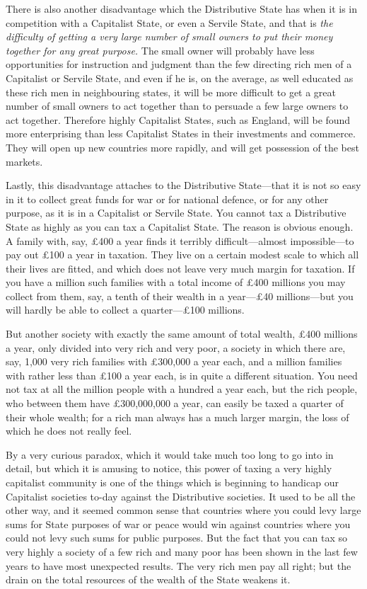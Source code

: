 \documentclass{book}
\begin{document}
There is also another disadvantage which the Distributive State has when it is in competition with a Capitalist State, or even a Servile State, and that is \emph{the difficulty of getting a very large number of small owners to put their money together for any great purpose.} The small owner will probably have less opportunities for instruction and judgment than the few directing rich men of a Capitalist or Servile State, and even if he is, on the average, as well educated as these rich men in neighbouring states, it will be more difficult to get a great number of small owners to act together than to persuade a few large owners to act together. Therefore highly Capitalist States, such as England, will be found more enterprising than less Capitalist States in their investments and commerce. They will open up new countries more rapidly, and will get possession of the best markets.

Lastly, this disadvantage attaches to the Distributive State—that it is not so easy in it to collect great funds for war or for national defence, or for any other purpose, as it is in a Capitalist or Servile State. You cannot tax a Distributive State as highly as you can tax a Capitalist State. The reason is obvious enough. A family with, say, £400 a year finds it terribly difficult—almost impossible—to pay out £100 a year in taxation. They live on a certain modest scale to which all their lives are fitted, and which does not leave very much margin for taxation. If you have a million such families with a total income of £400 millions you may collect from them, say, a tenth of their wealth in a year—£40 millions—but you will hardly be able to collect a quarter—£100 millions.

But another society with exactly the same amount of total wealth, £400 millions a year, only divided into very rich and very poor, a society in which there are, say, 1,000 very rich families with £300,000 a year each, and a million families with rather less than £100 a year each, is in quite a different situation. You need not tax at all the million people with a hundred a year each, but the rich people, who between them have £300,000,000 a year, can easily be taxed a quarter of their whole wealth; for a rich man always has a much larger margin, the loss of which he does not really feel.

By a very curious paradox, which it would take much too long to go into in detail, but which it is amusing to notice, this power of taxing a very highly capitalist community is one of the things which is beginning to handicap our Capitalist societies to-day against the Distributive societies. It used to be all the other way, and it seemed common sense that countries where you could levy large sums for State purposes of war or peace would win against countries where you could not levy such sums for public purposes. But the fact that you can tax so very highly a society of a few rich and many poor has been shown in the last few years to have most unexpected results. The very rich men pay all right; but the drain on the total resources of the wealth of the State weakens it.
\end{document}

